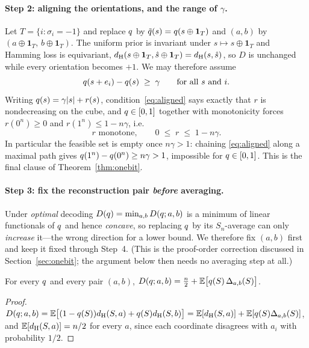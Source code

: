 \paragraph{Step 2: aligning the orientations, and the range of $\gamma$.}
Let $T = \{i : \sigma_i = -1\}$ and replace $q$ by
$\tilde{q}(s) = q(s \oplus \mathbf{1}_T)$ and $(a,b)$ by
$(a \oplus \mathbf{1}_T,\, b \oplus \mathbf{1}_T)$. The uniform prior is
invariant under $s \mapsto s \oplus \mathbf{1}_T$ and Hamming loss is
equivariant, $d_{\mathrm{H}}(s \oplus \mathbf{1}_T, \hat s \oplus \mathbf{1}_T) = d_{\mathrm{H}}(s,\hat s)$,
so $D$ is unchanged while every orientation becomes $+1$. We may therefore assume
\begin{equation}
  q(s + e_i) - q(s) \;\ge\; \gamma \qquad \text{for all } s \text{ and } i .
  \label{eq:aligned}
\end{equation}
Writing $q(s) = \gamma|s| + r(s)$, condition~\eqref{eq:aligned} says exactly
that $r$ is nondecreasing on the cube, and $q \in [0,1]$ together with
monotonicity forces $r(0^n) \ge 0$ and $r(1^n) \le 1 - n\gamma$, i.e.
\begin{equation}
  r \text{ monotone}, \qquad 0 \;\le\; r \;\le\; 1 - n\gamma .
  \label{eq:cone}
\end{equation}
In particular the feasible set is empty once $n\gamma > 1$: chaining
\eqref{eq:aligned} along a maximal path gives
$q(1^n) - q(0^n) \ge n\gamma > 1$, impossible for $q \in [0,1]$. This is
the final clause of Theorem~\ref{thm:onebit}.

\paragraph{Step 3: fix the reconstruction pair \emph{before} averaging.}
Under \emph{optimal} decoding $D(q) = \min_{a,b} D(q;a,b)$ is a minimum of
linear functionals of $q$ and hence \emph{concave}, so replacing $q$ by its
$S_n$-average can only \emph{increase} it---the wrong direction for a lower
bound. We therefore fix $(a,b)$ first and keep it fixed through Step~4. (This is
the proof-order correction discussed in Section~\ref{sec:onebit}; the argument
below then needs no averaging step at all.)

\begin{lemma}[Splitting]
\label{lem:split}
For every $q$ and every pair $(a,b)$,
$D(q;a,b) = \tfrac{n}{2} + \mathbb{E}\bigl[q(S)\,\Delta_{a,b}(S)\bigr]$.
\end{lemma}

\begin{proof}
$D(q;a,b) = \mathbb{E}\bigl[(1-q(S))d_{\mathrm{H}}(S,a) + q(S)d_{\mathrm{H}}(S,b)\bigr]
 = \mathbb{E}[d_{\mathrm{H}}(S,a)] + \mathbb{E}[q(S)\Delta_{a,b}(S)]$, and $\mathbb{E}[d_{\mathrm{H}}(S,a)] = n/2$ for
every $a$, since each coordinate disagrees with $a_i$ with probability $1/2$.
\end{proof}


